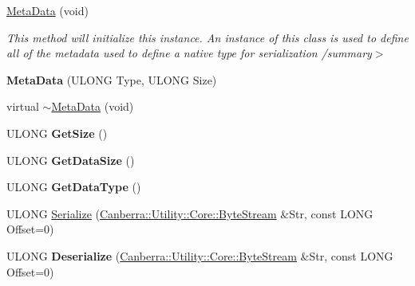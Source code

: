 \begin{DoxyCompactItemize}
\item 
\mbox{\label{class_canberra_1_1_serialization_1_1_meta_data_ac0f5a7680de1ec98ee47f963813ce4b7}} 
\hyperlink{class_canberra_1_1_serialization_1_1_meta_data_ac0f5a7680de1ec98ee47f963813ce4b7}{Meta\+Data} (void)
\begin{DoxyCompactList}\small\item\em This method will initialize this instance. An instance of this class is used to define all of the metadata used to define a native type for serialization /summary$>$ \end{DoxyCompactList}\item 
\mbox{\label{class_canberra_1_1_serialization_1_1_meta_data_afa100d4c0e3e07f5d4c793e2f33fd103}} 
{\bfseries Meta\+Data} (U\+L\+O\+NG Type, U\+L\+O\+NG Size)
\item 
virtual \hyperlink{class_canberra_1_1_serialization_1_1_meta_data_a6f64327b5e5669fd8ffd8d17c6bc3671_a6f64327b5e5669fd8ffd8d17c6bc3671}{$\sim$\+Meta\+Data} (void)
\item 
\mbox{\label{class_canberra_1_1_serialization_1_1_meta_data_aa79bd26609d171f0323fbf421c383f3b}} 
U\+L\+O\+NG {\bfseries Get\+Size} ()
\item 
\mbox{\label{class_canberra_1_1_serialization_1_1_meta_data_aafa5c9bcde507cd372997dfda39324bc}} 
U\+L\+O\+NG {\bfseries Get\+Data\+Size} ()
\item 
\mbox{\label{class_canberra_1_1_serialization_1_1_meta_data_a2bcc5a1a49c2ed6fc2dcd96482a931ae}} 
U\+L\+O\+NG {\bfseries Get\+Data\+Type} ()
\item 
U\+L\+O\+NG \hyperlink{class_canberra_1_1_serialization_1_1_meta_data_a2699805d188817a8e62446b4119615dc_a2699805d188817a8e62446b4119615dc}{Serialize} (\hyperlink{class_canberra_1_1_utility_1_1_core_1_1_byte_stream}{Canberra\+::\+Utility\+::\+Core\+::\+Byte\+Stream} \&Str, const L\+O\+NG Offset=0)
\item 
\mbox{\label{class_canberra_1_1_serialization_1_1_meta_data_ae5148a78ac0efed0fea149cee2471a2f}} 
U\+L\+O\+NG {\bfseries Deserialize} (\hyperlink{class_canberra_1_1_utility_1_1_core_1_1_byte_stream}{Canberra\+::\+Utility\+::\+Core\+::\+Byte\+Stream} \&Str, const L\+O\+NG Offset=0)
\end{DoxyCompactItemize}
